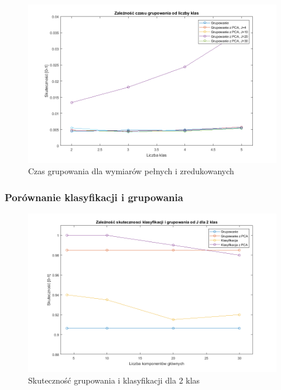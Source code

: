 \begin{figure}[H]
	\centering
	\hspace*{-0.8in}
	\includegraphics[scale = 0.7]{img/time_from_classes_group.png}
	\caption{Czas grupowania dla wymiarów pełnych i zredukowanych}  
	\label{rys:time_from_classes_group} 
\end{figure}

\subsubsection{Porównanie klasyfikacji i grupowania}

\begin{figure}[H]
	\centering
	\hspace*{-0.8in}
	\includegraphics[scale = 0.7]{img/acc_from_J_2classes.png}
	\caption{Skuteczność grupowania i klasyfikacji dla 2 klas}  
	\label{rys:acc_from_J_2classes} 
\end{figure}

